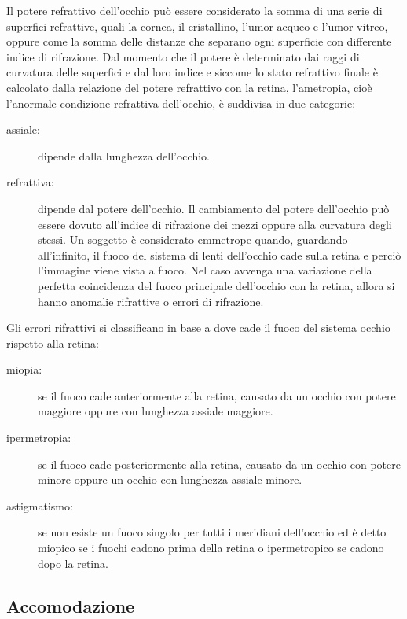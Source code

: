 Il potere refrattivo dell’occhio può essere considerato la somma di una serie di superfici refrattive, quali la cornea, il cristallino, l’umor acqueo e l’umor vitreo, oppure come la somma delle distanze che separano ogni superficie con differente indice di rifrazione. Dal momento che il potere è determinato dai raggi di curvatura delle superfici e dal loro indice e siccome lo stato refrattivo finale è calcolato dalla relazione del potere refrattivo con la retina, l’ametropia, cioè l’anormale condizione refrattiva dell’occhio, è suddivisa in due categorie:
 \begin{description} 
 \item[assiale:]dipende dalla lunghezza dell’occhio. 
 \item[refrattiva:]dipende dal potere dell’occhio. Il cambiamento del potere dell’occhio può essere dovuto all’indice di rifrazione dei mezzi oppure alla curvatura degli stessi.
Un soggetto è considerato emmetrope quando, guardando all’infinito, il fuoco del sistema di lenti dell’occhio cade sulla retina e perciò l’immagine viene vista a fuoco. Nel caso avvenga una variazione della perfetta coincidenza del fuoco principale dell’occhio con la retina, allora si hanno anomalie rifrattive o errori di rifrazione.
\end{description}
Gli errori rifrattivi si classificano in base a dove cade il fuoco del sistema occhio rispetto alla retina:
 \begin{description}
 \item[miopia:]se il fuoco cade anteriormente alla retina, causato da un occhio con potere maggiore oppure con lunghezza assiale maggiore.
 \item[ipermetropia:]se il fuoco cade posteriormente alla retina, causato da un occhio con potere minore oppure un occhio con lunghezza assiale minore.
 \item[astigmatismo:]se non esiste un fuoco singolo per tutti i meridiani dell’occhio ed è detto miopico se i fuochi cadono prima della retina o ipermetropico se cadono dopo la retina.
\end{description}


\subsection{Accomodazione}

